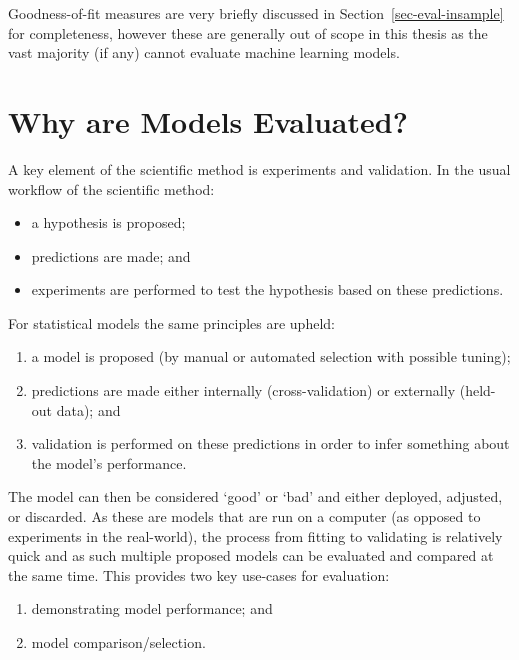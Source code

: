 \documentclass[
  letterpaper,
]{scrbook}
\providecommand{\tightlist}{%
  \setlength{\itemsep}{0pt}\setlength{\parskip}{0pt}}\usepackage{longtable,booktabs,array}
\theoremstyle{plain}
\theoremstyle{definition}
\theoremstyle{remark}
\begin{document}
Goodness-of-fit measures are very briefly discussed in
Section~\ref{sec-eval-insample} for completeness, however these are
generally out of scope in this thesis as the vast majority (if any)
cannot evaluate machine learning models.

\hypertarget{sec-eval-why-why}{%
\section{Why are Models Evaluated?}\label{sec-eval-why-why}}

A key element of the scientific method is experiments and validation. In
the usual workflow of the scientific method:

\begin{itemize}
\tightlist
\item
  a hypothesis is proposed;
\item
  predictions are made; and
\item
  experiments are performed to test the hypothesis based on these
  predictions.
\end{itemize}

For statistical models the same principles are upheld:

\begin{enumerate}
\def\labelenumi{\roman{enumi}.}
\tightlist
\item
  a model is proposed (by manual or automated selection with possible
  tuning);
\item
  predictions are made either internally (cross-validation) or
  externally (held-out data); and
\item
  validation is performed on these predictions in order to infer
  something about the model's performance.
\end{enumerate}

The model can then be considered `good' or `bad' and either deployed,
adjusted, or discarded. As these are models that are run on a computer
(as opposed to experiments in the real-world), the process from fitting
to validating is relatively quick and as such multiple proposed models
can be evaluated and compared at the same time. This provides two key
use-cases for evaluation:

\begin{enumerate}
\def\labelenumi{\roman{enumi}.}
\tightlist
\item
  demonstrating model performance; and
\item
  model comparison/selection.
\end{enumerate}
\end{document}
